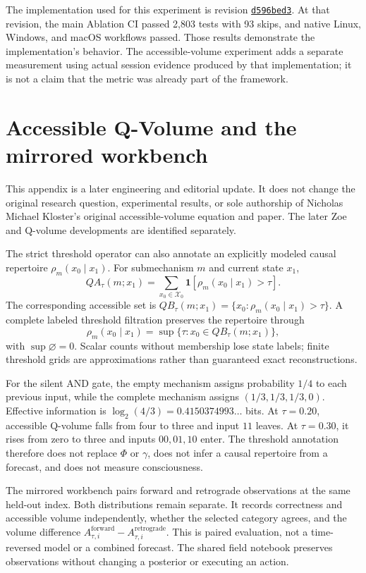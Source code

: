 \documentclass[11pt,a4paper]{article}
\begin{document}
The implementation used for this experiment is revision \href{https://github.com/Ablation-Tool/ablation/commit/d596bed31ba5fe361efa1c6fdad6d86e3126ab63}{\texttt{d596bed3}}. At that revision, the main Ablation CI passed 2,803 tests with 93 skips, and native Linux, Windows, and macOS workflows passed. Those results demonstrate the implementation's behavior. The accessible-volume experiment adds a separate measurement using actual session evidence produced by that implementation; it is not a claim that the metric was already part of the framework.

\section{Accessible Q-Volume and the mirrored workbench}
This appendix is a later engineering and editorial update. It does not change the original research question, experimental results, or sole authorship of Nicholas Michael Kloster's original accessible-volume equation and paper. The later Zoe and Q-volume developments are identified separately.

The strict threshold operator can also annotate an explicitly modeled causal repertoire $\rho_m(x_0\mid x_1)$. For submechanism $m$ and current state $x_1$,
\begin{equation}
QA_\tau(m;x_1)=\sum_{x_0\in\mathcal X_0}\mathbf 1[\rho_m(x_0\mid x_1)>\tau].
\end{equation}
The corresponding accessible set is $QB_\tau(m;x_1)=\{x_0:\rho_m(x_0\mid x_1)>\tau\}$. A complete labeled threshold filtration preserves the repertoire through
\begin{equation}
\rho_m(x_0\mid x_1)=\sup\{\tau:x_0\in QB_\tau(m;x_1)\},
\end{equation}
with $\sup\varnothing=0$. Scalar counts without membership lose state labels; finite threshold grids are approximations rather than guaranteed exact reconstructions.

For the silent AND gate, the empty mechanism assigns probability $1/4$ to each previous input, while the complete mechanism assigns $(1/3,1/3,1/3,0)$. Effective information is $\log_2(4/3)=0.4150374993\ldots$ bits. At $\tau=0.20$, accessible Q-volume falls from four to three and input $11$ leaves. At $\tau=0.30$, it rises from zero to three and inputs $00,01,10$ enter. The threshold annotation therefore does not replace $\Phi$ or $\gamma$, does not infer a causal repertoire from a forecast, and does not measure consciousness.

The mirrored workbench pairs forward and retrograde observations at the same held-out index. Both distributions remain separate. It records correctness and accessible volume independently, whether the selected category agrees, and the volume difference $A_{\tau,i}^{\mathrm{forward}}-A_{\tau,i}^{\mathrm{retrograde}}$. This is paired evaluation, not a time-reversed model or a combined forecast. The shared field notebook preserves observations without changing a posterior or executing an action.
\end{document}

